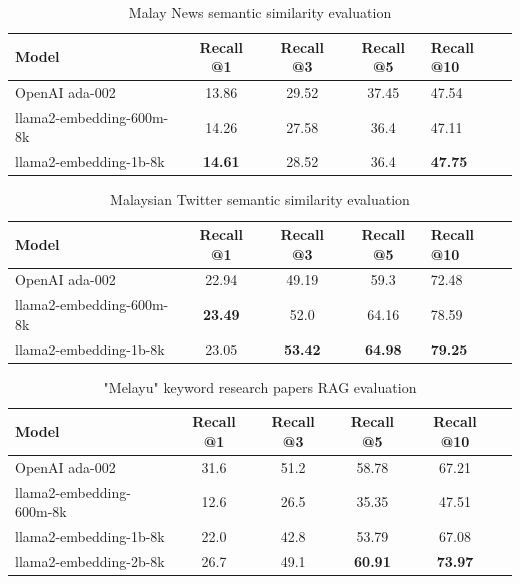 \documentclass[preprint]{article}
\begin{document}
\begin{table}[hbt!]
  \centering
  \begin{tabular}{lcccl}
    \hline
    \textbf{Model}           & \textbf{Recall @1} & \textbf{Recall @3} & \textbf{Recall @5} & \textbf{Recall @10} \\
    \hline
    OpenAI ada-002           & 13.86              & 29.52              & 37.45              & 47.54               \\
    llama2-embedding-600m-8k & 14.26              & 27.58              & 36.4               & 47.11               \\
    llama2-embedding-1b-8k   & \textbf{14.61}     & 28.52              & 36.4               & \textbf{47.75}      \\
    \hline
  \end{tabular}
  \caption{Malay News semantic similarity evaluation}
\end{table}

\begin{table}[hbt!]
  \centering
  \begin{tabular}{lcccl}
    \hline
    \textbf{Model}           & \textbf{Recall @1} & \textbf{Recall @3} & \textbf{Recall @5} & \textbf{Recall @10} \\
    \hline
    OpenAI ada-002           & 22.94              & 49.19              & 59.3               & 72.48               \\
    llama2-embedding-600m-8k & \textbf{23.49}     & 52.0               & 64.16              & 78.59               \\
    llama2-embedding-1b-8k   & 23.05              & \textbf{53.42}     & \textbf{64.98}     & \textbf{79.25}      \\
    \hline
  \end{tabular}
  \caption{Malaysian Twitter semantic similarity evaluation}
\end{table}

\begin{table}[hbt!]
  \centering
  \begin{tabular}{lccccl}
    \hline
    \textbf{Model}           & \textbf{Recall @1} & \textbf{Recall @3} & \textbf{Recall @5} & \textbf{Recall @10} \\
    \hline
    OpenAI ada-002           & 31.6               & 51.2               & 58.78              & 67.21               \\
    llama2-embedding-600m-8k & 12.6               & 26.5               & 35.35              & 47.51               \\
    llama2-embedding-1b-8k   & 22.0               & 42.8               & 53.79              & 67.08               \\
    llama2-embedding-2b-8k   & 26.7               & 49.1               & \textbf{60.91}     & \textbf{73.97}      \\
    \hline
  \end{tabular}
  \caption{"Melayu" keyword research papers RAG evaluation}
\end{table}
\end{document}
